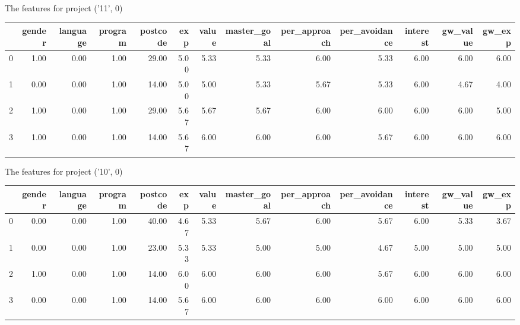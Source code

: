 \documentclass[7pt]{article}
\begin{document}
\begin{landscape}
The features for project ('11', 0)\newline
\begin{tabular}{lrrrrrrrrrrrr}
\toprule
{} &  gender &  language &  program &  postcode &  exp &  value &  master\_goal &  per\_approach &  per\_avoidance &  interest &  gw\_value &  gw\_exp \\
\midrule
0 &    1.00 &      0.00 &     1.00 &     29.00 & 5.00 &   5.33 &         5.33 &          6.00 &           5.33 &      6.00 &             6.00 &           6.00 \\
1 &    0.00 &      0.00 &     1.00 &     14.00 & 5.00 &   5.00 &         5.33 &          5.67 &           5.33 &      6.00 &             4.67 &           4.00 \\
2 &    1.00 &      0.00 &     1.00 &     29.00 & 5.67 &   5.67 &         5.67 &          6.00 &           6.00 &      6.00 &             6.00 &           5.00 \\
3 &    1.00 &      0.00 &     1.00 &     14.00 & 5.67 &   6.00 &         6.00 &          6.00 &           5.67 &      6.00 &             6.00 &           6.00 \\
\bottomrule
\end{tabular}

The features for project ('10', 0)\newline
\begin{tabular}{lrrrrrrrrrrrr}
\toprule
{} &  gender &  language &  program &  postcode &  exp &  value &  master\_goal &  per\_approach &  per\_avoidance &  interest &  gw\_value &  gw\_exp \\
\midrule
0 &    0.00 &      0.00 &     1.00 &     40.00 & 4.67 &   5.33 &         5.67 &          6.00 &           5.67 &      6.00 &             5.33 &           3.67 \\
1 &    0.00 &      0.00 &     1.00 &     23.00 & 5.33 &   5.33 &         5.00 &          5.00 &           4.67 &      5.00 &             5.00 &           5.00 \\
2 &    1.00 &      0.00 &     1.00 &     14.00 & 6.00 &   6.00 &         6.00 &          6.00 &           5.67 &      6.00 &             6.00 &           6.00 \\
3 &    0.00 &      0.00 &     1.00 &     14.00 & 5.67 &   6.00 &         6.00 &          6.00 &           6.00 &      6.00 &             6.00 &           6.00 \\
\bottomrule
\end{tabular}


\end{landscape}
\end{document}
